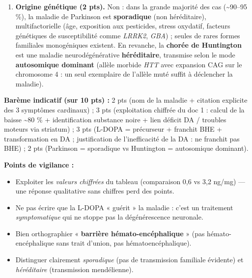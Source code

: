 \documentclass[11pt]{article}
\begin{document}
\begin{corrige}
\begin{enumerate}
\item \textbf{Origine génétique (2 pts).} Non : dans la grande majorité des cas (\textasciitilde 90--95 \%), la maladie de Parkinson est \textbf{sporadique} (non héréditaire), multifactorielle (âge, exposition aux pesticides, stress oxydatif, facteurs génétiques de susceptibilité comme \emph{LRRK2}, \emph{GBA}) ; seules de rares formes familiales monogéniques existent. En revanche, la \textbf{chorée de Huntington} est une maladie neurodégénérative \textbf{héréditaire}, transmise selon le mode \textbf{autosomique dominant} (allèle morbide \emph{HTT} avec expansion CAG sur le chromosome 4 : un seul exemplaire de l'allèle muté suffit à déclencher la maladie).
\end{enumerate}
\textbf{Barème indicatif (sur 10 pts) :} 2 pts (nom de la maladie + citation explicite des 3 symptômes cardinaux) ; 3 pts (exploitation chiffrée du doc 1 : calcul de la baisse \textasciitilde 80 \% + identification substance noire + lien déficit DA / troubles moteurs via striatum) ; 3 pts (L-DOPA = précurseur + franchit BHE + transformation en DA ; justification de l'inefficacité de la DA : ne franchit pas BHE) ; 2 pts (Parkinson = sporadique vs Huntington = autosomique dominant).

\textbf{Points de vigilance :}
\begin{itemize}
\item Exploiter les \emph{valeurs chiffrées} du tableau (comparaison 0,6 vs 3,2 ng/mg) — une réponse qualitative sans chiffres perd des points.
\item Ne pas écrire que la L-DOPA « guérit » la maladie : c'est un traitement \emph{symptomatique} qui ne stoppe pas la dégénérescence neuronale.
\item Bien orthographier « \textbf{barrière hémato-encéphalique} » (pas hémato-encéphalique sans trait d'union, pas hématoencéphalique).
\item Distinguer clairement \emph{sporadique} (pas de transmission familiale évidente) et \emph{héréditaire} (transmission mendélienne).
\end{itemize}
\end{corrige}
\end{document}
